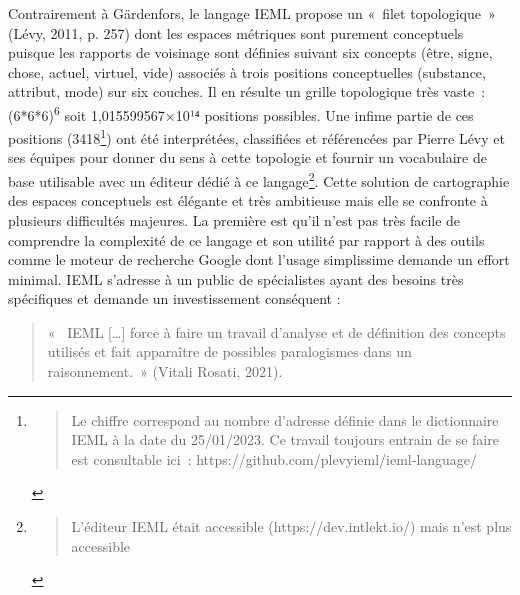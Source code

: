 \documentclass[
  a4paper,
  DIV=11,
  numbers=noendperiod]{scrreprt}
\begin{document}
Contrairement à Gärdenfors, le langage IEML propose un «~filet
topologique~» (Lévy, 2011, p. 257) dont les espaces métriques sont
purement conceptuels puisque les rapports de voisinage sont définies
suivant six concepts (être, signe, chose, actuel, virtuel, vide)
associés à trois positions conceptuelles (substance, attribut, mode) sur
six couches. Il en résulte un grille topologique très vaste~:
(6*6*6)\textsuperscript{6} soit 1,015599567×10¹⁴ positions possibles.
Une infime partie de ces positions (3418\footnote{\begin{quote}
  Le chiffre correspond au nombre d'adresse définie dans le dictionnaire
  IEML à la date du 25/01/2023. Ce travail toujours entrain de se faire
  est consultable ici~: https://github.com/plevyieml/ieml-language/
  \end{quote}}) ont été interprétées, classifiées et référencées par
Pierre Lévy et ses équipes pour donner du sens à cette topologie et
fournir un vocabulaire de base utilisable avec un éditeur dédié à ce
langage\footnote{\begin{quote}
  L'éditeur IEML était accessible (https://dev.intlekt.io/) mais n'est
  plus accessible
  \end{quote}}. Cette solution de cartographie des espaces conceptuels
est élégante et très ambitieuse mais elle se confronte à plusieurs
difficultés majeures. La première est qu'il n'est pas très facile de
comprendre la complexité de ce langage et son utilité par rapport à des
outils comme le moteur de recherche Google dont l'usage simplissime
demande un effort minimal. IEML s'adresse à un public de spécialistes
ayant des besoins très spécifiques et demande un investissement
conséquent :

\begin{quote}
«~ IEML {[}\ldots{]} force à faire un travail d'analyse et de définition
des concepts utilisés et fait apparaître de possibles paralogismes dans
un raisonnement.~» (Vitali Rosati, 2021).
\end{quote}
\end{document}
